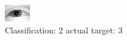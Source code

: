 \begin{figure}[h!]
\begin{center}
\includegraphics[width=0.60\columnwidth]{figures/ID2388_class_2_target_3.png}
\end{center}
\caption{ Classification: 2 actual target: 3}
\label{fig:ID2388_class_2_target_3}
\end{figure}
